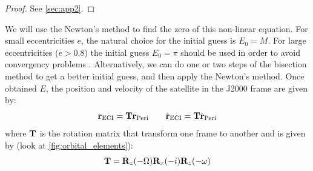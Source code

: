 \documentclass[../main.tex]{subfiles}
\begin{document}
\begin{proof}
  See \cref{sec:app2}.
\end{proof}
We will use the Newton's method to find the zero of this non-linear equation. For small eccentricities $e$, the natural choice for the initial guess is $E_0=M$. For large eccentricities ($e>0.8$) the initial guess $E_0=\pi$ should be used in order to avoid convergency problems \cite{montenbruck}. Alternatively, we can do one or two steps of the bisection method to get a better initial guess, and then apply the Newton's method. Once obtained $E$, the position and velocity of the satellite in the J2000 frame are given by:
\begin{equation}
  \boldsymbol{\mathrm{r}}_\mathrm{ECI} = \boldsymbol{\mathrm{T}}\boldsymbol{\mathrm{r}}_\mathrm{Peri} \qquad \dot{\boldsymbol{\mathrm{r}}}_\mathrm{ECI} = \boldsymbol{\mathrm{T}}\dot{\boldsymbol{\mathrm{r}}}_\mathrm{Peri}
\end{equation}
where $\boldsymbol{\mathrm{T}}$ is the rotation matrix that transform one frame to another and is given by (look at \cref{fig:orbital_elements}):
\begin{equation}
  \boldsymbol{\mathrm{T}}=\boldsymbol{\mathrm{R}}_z(-\Omega)\boldsymbol{\mathrm{R}}_x(-i)\boldsymbol{\mathrm{R}}_z(-\omega)
\end{equation}
\end{document}
